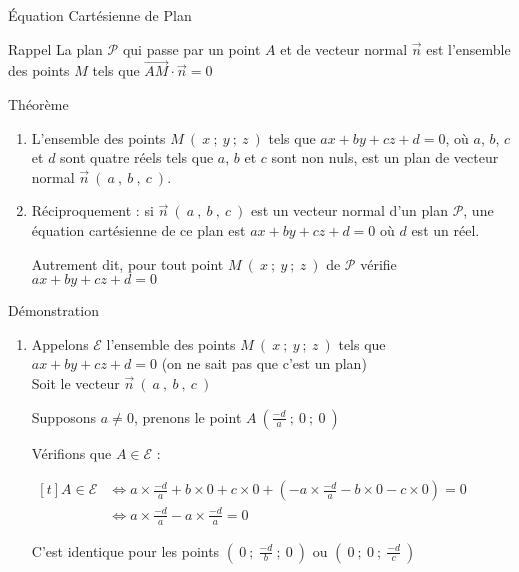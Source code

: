 \documentclass{cours}
\begin{document}
    \begin{Gpartie}{Équation Cartésienne de Plan} 
        \begin{Spartie}{Rappel} 
            La plan $\mathcal{P}$ qui passe par un point $A$ et de vecteur normal $\vec{n}$ est l'ensemble des points $M$ tels que $\overrightarrow{AM}\cdot\vec{n}=0$
        \end{Spartie}
        \begin{Spartie}{Théorème} 
            \begin{enumerate}[(1)]
                \item   L'ensemble des points $M~\left(~x~;~y~;~z~\right)$ tels que $ax+by+cz+d=0$, où $a$, $b$, $c$ et $d$ sont quatre réels tels que $a$, $b$ et $c$ sont non nuls, est un plan de vecteur normal $\vec{n}~\left(~a~,~b~,~c~\right)$.
                
                \item   Réciproquement : si $\vec{n}~\left(~a~,~b~,~c~\right)$ est un vecteur normal d'un plan $\mathcal{P}$, une équation cartésienne de ce plan est $ax+by+cz+d=0$ où $d$ est un réel.
                
                Autrement dit, pour tout point $M~\left(~x~;~y~;~z~\right)$ de $\mathcal{P}$ vérifie $ax+by+cz+d=0$
            \end{enumerate}
            \pagebreak
            \begin{SSpartie}{Démonstration} 
                \begin{enumerate}[(1)]
                    \item   Appelons $\mathcal{E}$ l'ensemble des points $M~\left(~x~;~y~;~z~\right)$ tels que $ax+by+cz+d=0$ (on ne sait pas que c'est un plan) \\ Soit le vecteur $\vec{n}~\left(~a~,~b~,~c~\right)$
                    
                    Supposons $a\neq 0$, prenons le point $A~\left(\frac{-d}{a}~;~0~;~0~\right)$

                    Vérifions que $A\in\mathcal{E}$ :

                    $\begin{aligned}[t]
                        A\in\mathcal{E}&\iff a\times\tfrac{-d}{a}+b\times0+c\times0+\left(-a\times\tfrac{-d}{a}-b\times0-c\times0\right)=0 \\
                        &\iff a\times\tfrac{-d}{a}-a\times\tfrac{-d}{a}=0
                    \end{aligned}$

                    C'est identique pour les points $\left(~0~;~\frac{-d}{b}~;~0~\right)$ ou $\left(~0~;~0~;~\frac{-d}{c}~\right)$
                    

\end{enumerate}
\end{SSpartie}
\end{Spartie}
\end{Gpartie}
\end{document}
